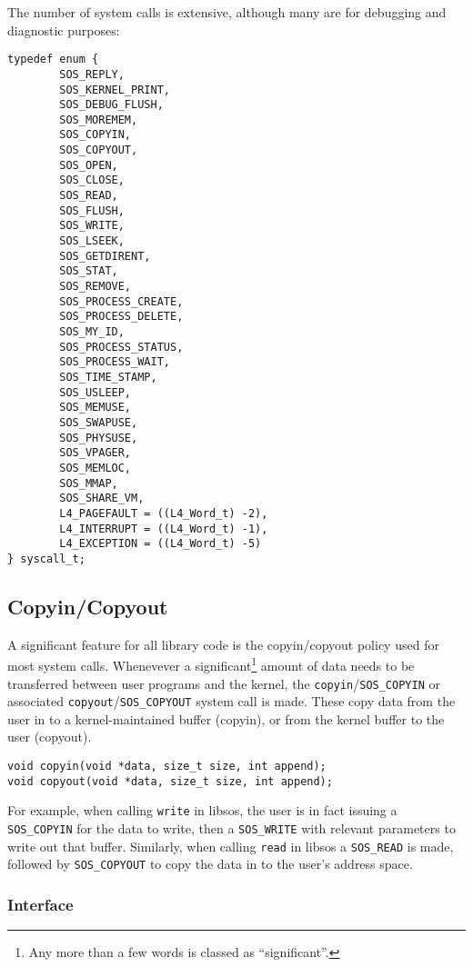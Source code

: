 \documentclass[12pt,english]{article}
\begin{document}
The number of system calls is extensive, although many are for debugging and diagnostic purposes:

\begin{verbatim}
typedef enum {
        SOS_REPLY,
        SOS_KERNEL_PRINT,
        SOS_DEBUG_FLUSH,
        SOS_MOREMEM,
        SOS_COPYIN,
        SOS_COPYOUT,
        SOS_OPEN,
        SOS_CLOSE,
        SOS_READ,
        SOS_FLUSH,
        SOS_WRITE,
        SOS_LSEEK,
        SOS_GETDIRENT,
        SOS_STAT,
        SOS_REMOVE,
        SOS_PROCESS_CREATE,
        SOS_PROCESS_DELETE,
        SOS_MY_ID,
        SOS_PROCESS_STATUS,
        SOS_PROCESS_WAIT,
        SOS_TIME_STAMP,
        SOS_USLEEP,
        SOS_MEMUSE,
        SOS_SWAPUSE,
        SOS_PHYSUSE,
        SOS_VPAGER,
        SOS_MEMLOC,
        SOS_MMAP,
        SOS_SHARE_VM,
        L4_PAGEFAULT = ((L4_Word_t) -2),
        L4_INTERRUPT = ((L4_Word_t) -1),
        L4_EXCEPTION = ((L4_Word_t) -5)
} syscall_t;
\end{verbatim}

\subsection{Copyin/Copyout} \label{sub:copyin_copyout}

A significant feature for all library code is the copyin/copyout policy used for most system calls.  Whenevever a significant\footnote{Any more than a few words is classed as ``significant''.} amount of data needs to be transferred between user programs and the kernel, the \texttt{copyin}/\texttt{SOS\_COPYIN} or associated \texttt{copyout}/\texttt{SOS\_COPYOUT} system call is made.  These copy data from the user in to a kernel-maintained buffer (copyin), or from the kernel buffer to the user (copyout).

\begin{verbatim}
void copyin(void *data, size_t size, int append);
void copyout(void *data, size_t size, int append);
\end{verbatim}

For example, when calling \texttt{write} in libsos, the user is in fact issuing a \texttt{SOS\_COPYIN} for the data to write, then a \texttt{SOS\_WRITE} with relevant parameters to write out that buffer.  Similarly, when calling \texttt{read} in libsos a \texttt{SOS\_READ} is made, followed by \texttt{SOS\_COPYOUT} to copy the data in to the user's address space.

\subsubsection{Interface}
\end{document}
